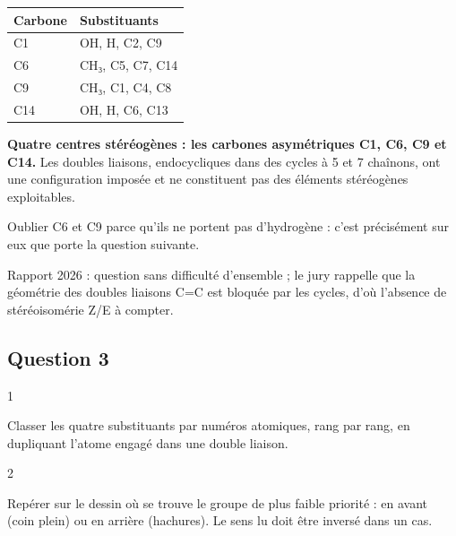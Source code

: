 \documentclass[11pt,a4paper]{article}
\begin{document}
\begin{longtable}[]{@{}ll@{}}
\toprule\noalign{}
Carbone & Substituants \\
\midrule\noalign{}
\endhead
\bottomrule\noalign{}
\endlastfoot
C1 & OH, H, C2, C9 \\
C6 & CH₃, C5, C7, C14 \\
C9 & CH₃, C1, C4, C8 \\
C14 & OH, H, C6, C13 \\
\end{longtable}

\textbf{Quatre centres stéréogènes : les carbones asymétriques C1, C6, C9 et C14.} Les doubles liaisons, endocycliques dans des cycles à 5 et 7 chaînons, ont une configuration imposée et ne constituent pas des éléments stéréogènes exploitables.

\begin{piege}

Oublier C6 et C9 parce qu'ils ne portent pas d'hydrogène : c'est précisément sur eux que porte la question suivante.

\end{piege}

\begin{jury}

Rapport 2026 : question sans difficulté d'ensemble ; le jury rappelle que la géométrie des doubles liaisons C=C est bloquée par les cycles, d'où l'absence de stéréoisomérie Z/E à compter.

\end{jury}

\hypertarget{question-3}{%
\subsection{Question 3}\label{question-3}}

\begin{indication}{1}

Classer les quatre substituants par numéros atomiques, rang par rang, en dupliquant l'atome engagé dans une double liaison.

\end{indication}

\begin{indication}{2}

Repérer sur le dessin où se trouve le groupe de plus faible priorité : en avant (coin plein) ou en arrière (hachures). Le sens lu doit être inversé dans un cas.

\end{indication}
\end{document}
